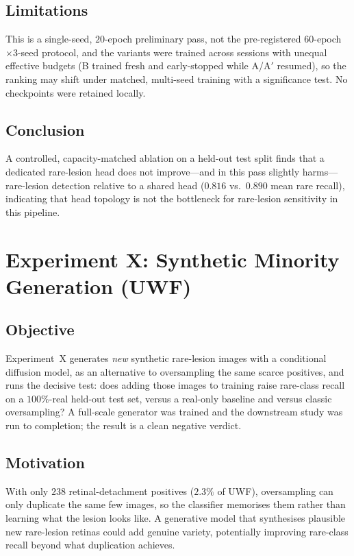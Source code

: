 \documentclass[journal,twoside,web]{ieeecolor}
\begin{document}
\subsection{Limitations}
This is a single-seed, $20$-epoch preliminary pass, not the pre-registered
$60$-epoch $\times 3$-seed protocol, and the variants were trained across sessions
with unequal effective budgets (B trained fresh and early-stopped while A/A$'$
resumed), so the ranking may shift under matched, multi-seed training with a
significance test. No checkpoints were retained locally.

\subsection{Conclusion}
A controlled, capacity-matched ablation on a held-out test split finds that a
dedicated rare-lesion head does not improve---and in this pass slightly harms---
rare-lesion detection relative to a shared head ($0.816$ vs.\ $0.890$ mean rare
recall), indicating that head topology is not the bottleneck for rare-lesion
sensitivity in this pipeline.

\section{Experiment X: Synthetic Minority Generation (UWF)}
\label{sec:exp10}

\subsection{Objective}
Experiment~X generates \emph{new} synthetic rare-lesion images with a conditional
diffusion model, as an alternative to oversampling the same scarce positives, and
runs the decisive test: does adding those images to training raise rare-class recall
on a $100\%$-real held-out test set, versus a real-only baseline and versus classic
oversampling? A full-scale generator was trained and the downstream study was run to
completion; the result is a clean negative verdict.

\subsection{Motivation}
With only $238$ retinal-detachment positives ($2.3\%$ of UWF), oversampling can
only duplicate the same few images, so the classifier memorises them rather than
learning what the lesion looks like. A generative model that synthesises plausible
new rare-lesion retinas could add genuine variety, potentially improving
rare-class recall beyond what duplication achieves.
\end{document}
